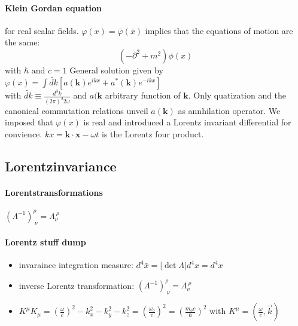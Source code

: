 \paragraph{Klein Gordan equation} for real scalar fields. $\varphi (x) = \bar{\varphi}(\bar{x})$ implies that the equations of motion are the same:
$$ (- \partial^2 + m^2)\phi(x)$$ with $\hbar \text{ and } c = 1$
General solution given by $\varphi(x)=\int \widetilde{d k}\left[a(\mathbf{k}) e^{i k x}+a^*(\mathbf{k}) e^{-i k x}\right]$\\
with $ \widetilde{d k} \equiv \frac{d^3 k}{(2 \pi)^3 2 \omega}$ and $a(\mathbf{k}$ arbitrary function of $\mathbf{k}$. Only quatization and the canonical commutation relations unveil $a(\mathbf{k})$ as annhilation operator. 
We imposed that $\varphi(x)$ is real and introduced a Lorentz invariant differential for convience. $k x=\mathbf{k} \cdot \mathbf{x}-\omega t$ is the Lorentz four product. 

\subsection{Lorentzinvariance}


\paragraph{Lorentstransformations} $\left(\Lambda^{-1}\right)_{\ \nu}^\rho=\Lambda_\nu^{\ \rho}$

\paragraph{Lorentz stuff dump}
\begin{itemize}
  \item invaraince integration measure: $d^4 \bar{x}=|\operatorname{det} \Lambda| d^4 x=d^4 x$
  \item inverse Lorentz transformation: $\left(\Lambda^{-1}\right)_{\ \nu}^\rho=\Lambda_\nu^{\ \rho}$
  \item $K^\mu K_\mu=\left(\frac{\omega}{c}\right)^2-k_x^2-k_y^2-k_z^2=\left(\frac{\omega_o}{c}\right)^2=\left(\frac{m_o c}{\hbar}\right)^2$ with $K^\mu = \left( \frac{\omega}{c} , \vec{k} \right)$
\end{itemize}








